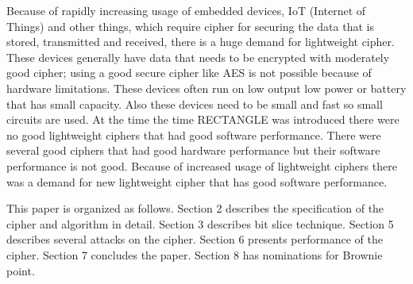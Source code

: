 \documentclass[final]{transcrypto}
\begin{document}
Because of rapidly increasing usage of embedded devices, IoT (Internet of Things) and other things, which require cipher for securing the data that is stored, transmitted and received, there is a huge demand for lightweight cipher\cite{iot}. These devices generally have data that needs to be encrypted with moderately good cipher; using a good secure cipher like AES is not possible because of hardware limitations. These devices often run on low output low power or battery that has small capacity. Also these devices need to be small and fast so small circuits are used. At the time the time RECTANGLE was introduced there were no good lightweight ciphers that had good software performance. There were several good ciphers that had good hardware performance but their software performance is not good. Because of increased usage of lightweight ciphers there was a demand for new lightweight cipher that has good software performance.\cite{sec}

This paper is organized as follows. Section 2 describes the specification of the cipher and algorithm in detail. Section 3 describes bit slice technique. Section 5 describes several attacks on the cipher. Section 6 presents performance of the cipher. Section 7 concludes the paper. Section 8 has nominations for Brownie point.
\end{document}
